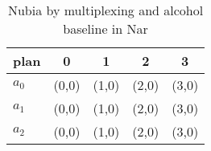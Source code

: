 \documentclass[a4paper]{article}
\begin{document}
\begin{table}
\begin{adjustbox}{width=0.5\columnwidth}
\begin{tabular}{|l|l|l|l|l|}
\hline
\textbf{plan} & \multicolumn{1}{c|}{\textbf{0}} & \multicolumn{1}{c|}{\textbf{1}} & \multicolumn{1}{c|}{\textbf{2}} & \multicolumn{1}{c|}{\textbf{3}} \\ \hline
\textbf{$a_0$}  & (0,0) & (1,0) & (2,0) & (3,0) \\ \hline
\textbf{$a_1$}  & (0,0) & (1,0) & (2,0) & (3,0) \\ \hline
\textbf{$a_2$}  & (0,0) & (1,0) & (2,0) & (3,0) \\ \hline
\end{tabular}
\end{adjustbox}
\caption{Nubia by multiplexing and alcohol baseline in Nar
}
\end{table}
\end{document}
